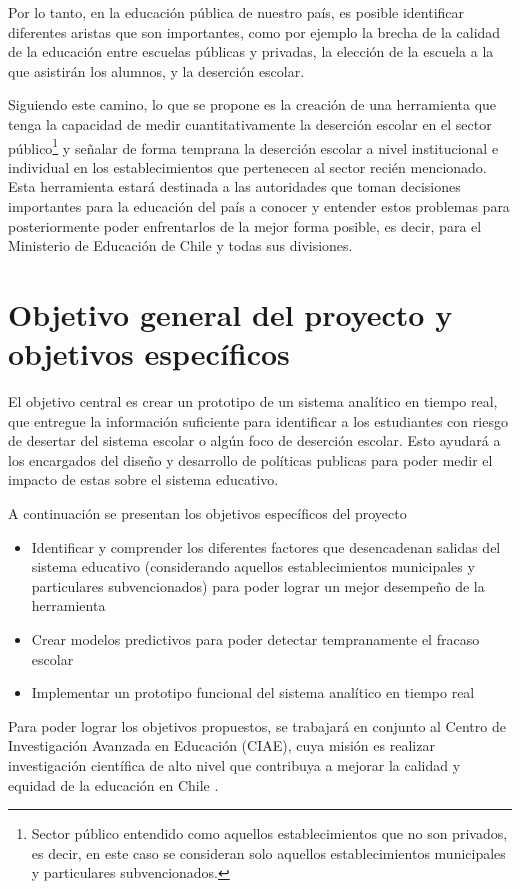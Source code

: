 Por lo tanto, en la educación pública de nuestro país, es posible identificar diferentes aristas que son importantes, como por ejemplo la brecha de la calidad de la educación entre escuelas públicas y privadas, la elección de la escuela a la que asistirán los alumnos, y la deserción escolar.

Siguiendo este camino, lo que se propone es la creación de una herramienta que tenga la capacidad de medir cuantitativamente la deserción escolar en el sector público\footnote{Sector público entendido como aquellos establecimientos que no son privados, es decir, en este caso se consideran solo aquellos establecimientos municipales y particulares subvencionados.} y señalar de forma temprana la deserción escolar a nivel institucional e individual en los establecimientos que pertenecen al sector recién mencionado.
Esta herramienta estará destinada a las autoridades que toman decisiones importantes para la educación del país a conocer y entender estos problemas para posteriormente poder enfrentarlos de la mejor forma posible, es decir, para el Ministerio de Educación de Chile y todas sus divisiones. 


\section{Objetivo general del proyecto y objetivos específicos}
El objetivo central es crear un prototipo de un sistema analítico en tiempo real, que entregue la información suficiente para identificar a los estudiantes con riesgo de desertar del sistema escolar o algún foco de deserción escolar. Esto ayudará a los encargados del diseño y desarrollo de políticas publicas para poder medir el impacto de estas sobre el sistema educativo.

A continuación se presentan los objetivos específicos del proyecto
\begin{itemize}
\item Identificar y comprender los diferentes factores que desencadenan salidas del sistema educativo (considerando aquellos establecimientos municipales y particulares subvencionados) para poder lograr un mejor desempeño de la herramienta
\item Crear modelos predictivos para poder detectar tempranamente el fracaso escolar
\item Implementar un prototipo funcional del sistema analítico en tiempo real
\end{itemize}

Para poder lograr los objetivos propuestos, se trabajará en conjunto al Centro de Investigación Avanzada en Educación (CIAE), cuya misión es realizar investigación científica de alto nivel que contribuya a mejorar la calidad y equidad de la educación en Chile \cite{ciae}.

